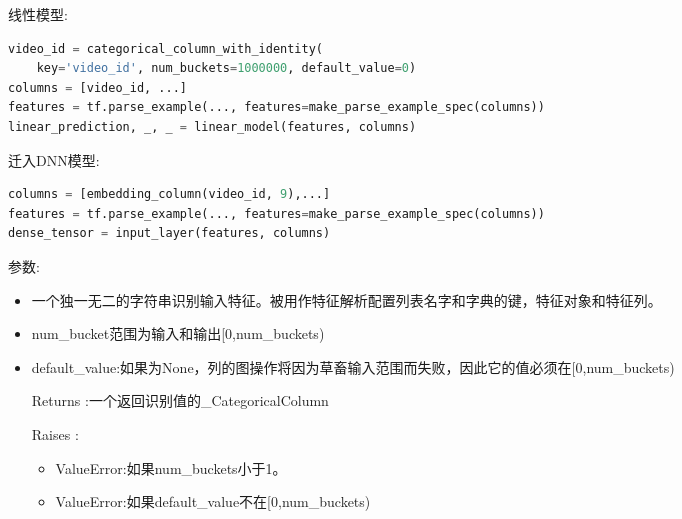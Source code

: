 线性模型:
\begin{lstlisting}[language=Python]
video_id = categorical_column_with_identity(
    key='video_id', num_buckets=1000000, default_value=0)
columns = [video_id, ...]
features = tf.parse_example(..., features=make_parse_example_spec(columns))
linear_prediction, _, _ = linear_model(features, columns)
\end{lstlisting}
迁入DNN模型:
\begin{lstlisting}[language=Python]
columns = [embedding_column(video_id, 9),...]
features = tf.parse_example(..., features=make_parse_example_spec(columns))
dense_tensor = input_layer(features, columns)
\end{lstlisting}
参数:
\begin{itemize}
	\item 一个独一无二的字符串识别输入特征。被用作特征解析配置列表名字和字典的键，特征对象和特征列。
	\item num\_bucket范围为输入和输出[0,num\_buckets)
	\item default\_value:如果为None，列的图操作将因为草畜输入范围而失败，因此它的值必须在[0,num\_buckets)
	\item[Returns]:一个返回识别值的\_CategoricalColumn
	\item[Raises]:
	\begin{itemize}
		\item ValueError:如果num\_buckets小于1。
		\item ValueError:如果default\_value不在[0,num\_buckets)
	\end{itemize}
\end{itemize}
